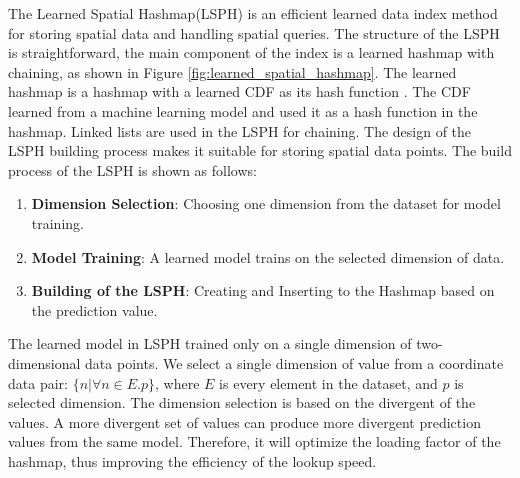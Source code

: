 \begin{figure}[ht]
\end{figure}

The Learned Spatial Hashmap(LSPH) is an efficient learned data index method for storing spatial data and handling spatial queries. The structure of the LSPH is straightforward, the main component of the index is a learned hashmap with chaining, as shown in Figure \ref{fig:learned_spatial_hashmap}. The learned hashmap is a hashmap with a learned CDF as its hash function \cite{Kraska:2017vh}. The CDF learned from a machine learning model and used it as a hash function in the hashmap. Linked lists are used in the LSPH for chaining. The design of the LSPH building process makes it suitable for storing spatial data points. The build process of the LSPH is shown as follows:

\begin{enumerate}
    \item \textbf{Dimension Selection}: Choosing one dimension from the dataset for model training.
    \item \textbf{Model Training}: A learned model trains on the selected dimension of data. 
    \item \textbf{Building of the LSPH}: Creating and Inserting to the Hashmap based on the prediction value.
\end{enumerate}

The learned model in LSPH trained only on a single dimension of two-dimensional data points. We select a single dimension of value from a coordinate data pair: $\{n|\forall n \in E.p\}$, where $E$ is every element in the dataset, and $p$ is selected dimension. The dimension selection is based on the  divergent of the values. A more divergent set of values can produce more divergent prediction values  from the same model. Therefore, it will optimize the loading factor of the hashmap, thus improving the efficiency of the lookup speed.


